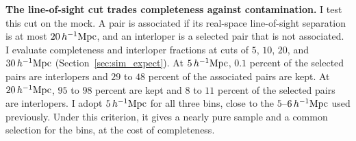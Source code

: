 \documentclass[11pt,letterpaper]{article}
\newcommand{\hinvMpc}{h^{-1}{\rm Mpc}}
\begin{document}
\textbf{The line-of-sight cut trades completeness against contamination.}
I test this cut on the mock. A pair is associated if its real-space
line-of-sight separation is at most $20\,\hinvMpc$, and an interloper is a
selected pair that is not associated. I evaluate completeness and interloper
fractions at cuts of $5$, $10$, $20$, and
$30\,\hinvMpc$ (Section~\ref{sec:sim_expect}). At $5\,\hinvMpc$, $0.1$ percent
of the selected pairs are interlopers and $29$ to $48$ percent of the
associated pairs are kept. At $20\,\hinvMpc$, $95$ to $98$ percent are kept
and $8$ to $11$ percent of the selected pairs are interlopers.
I adopt
$5\,\hinvMpc$ for all three bins, close to the $5$--$6\,\hinvMpc$ used
previously. Under this criterion, it gives a nearly pure sample and a common selection for the
bins, at the cost of completeness.


\clearpage


\end{document}
